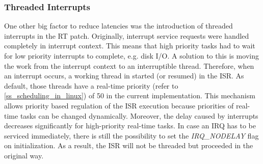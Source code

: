 \subsubsection{Threaded Interrupts}\label{ss_threaded_interrupts}
One other big factor to reduce latencies was the introduction of threaded interrupts in the RT patch.
Originally, interrupt service requests were handled completely in interrupt context.
This means that high priority tasks had to wait for low priority interrupts to complete, e.g. disk \ac{I/O}.
A solution to this is moving the work from the interrupt context to an interruptible thread.
Therefore, when an interrupt occurs, a working thread in started (or resumed) in the \ac{ISR}.
As default, those threads have a real-time priority (refer to \ref{ss_scheduling_in_linux}) of 50 in the current implementation.
This mechanism allows priority based regulation of the \ac{ISR} execution because priorities of real-time tasks can be changed dynamically. 
Moreover, the delay caused by interrupts decreases significantly for high-priority real-time tasks.
In case an \ac{IRQ} has to be serviced immediately, there is still the possibility to set the \textit{IRQ\_NODELAY} flag on initialization.
As a result, the \ac{ISR} will not be threaded but proceeded in the original way. 
